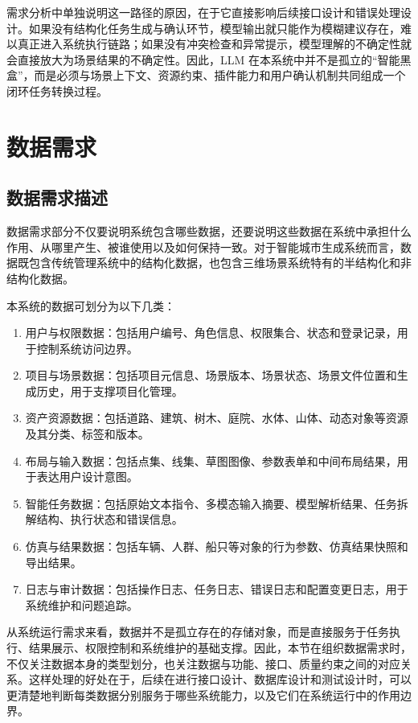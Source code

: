 \documentclass[UTF8,a4paper,10pt]{ctexart}
\begin{document}
需求分析中单独说明这一路径的原因，在于它直接影响后续接口设计和错误处理设计。如果没有结构化任务生成与确认环节，模型输出就只能作为模糊建议存在，难以真正进入系统执行链路；如果没有冲突检查和异常提示，模型理解的不确定性就会直接放大为场景结果的不确定性。因此，LLM 在本系统中并不是孤立的“智能黑盒”，而是必须与场景上下文、资源约束、插件能力和用户确认机制共同组成一个闭环任务转换过程。


\section{数据需求}

\subsection{数据需求描述}
数据需求部分不仅要说明系统包含哪些数据，还要说明这些数据在系统中承担什么作用、从哪里产生、被谁使用以及如何保持一致。对于智能城市生成系统而言，数据既包含传统管理系统中的结构化数据，也包含三维场景系统特有的半结构化和非结构化数据。

本系统的数据可划分为以下几类：
\begin{enumerate}[label=\arabic*.]
    \item 用户与权限数据：包括用户编号、角色信息、权限集合、状态和登录记录，用于控制系统访问边界。
    \item 项目与场景数据：包括项目元信息、场景版本、场景状态、场景文件位置和生成历史，用于支撑项目化管理。
    \item 资产资源数据：包括道路、建筑、树木、庭院、水体、山体、动态对象等资源及其分类、标签和版本。
    \item 布局与输入数据：包括点集、线集、草图图像、参数表单和中间布局结果，用于表达用户设计意图。
    \item 智能任务数据：包括原始文本指令、多模态输入摘要、模型解析结果、任务拆解结构、执行状态和错误信息。
    \item 仿真与结果数据：包括车辆、人群、船只等对象的行为参数、仿真结果快照和导出结果。
    \item 日志与审计数据：包括操作日志、任务日志、错误日志和配置变更日志，用于系统维护和问题追踪。
\end{enumerate}

从系统运行需求来看，数据并不是孤立存在的存储对象，而是直接服务于任务执行、结果展示、权限控制和系统维护的基础支撑。因此，本节在组织数据需求时，不仅关注数据本身的类型划分，也关注数据与功能、接口、质量约束之间的对应关系。这样处理的好处在于，后续在进行接口设计、数据库设计和测试设计时，可以更清楚地判断每类数据分别服务于哪些系统能力，以及它们在系统运行中的作用边界。
\end{document}
